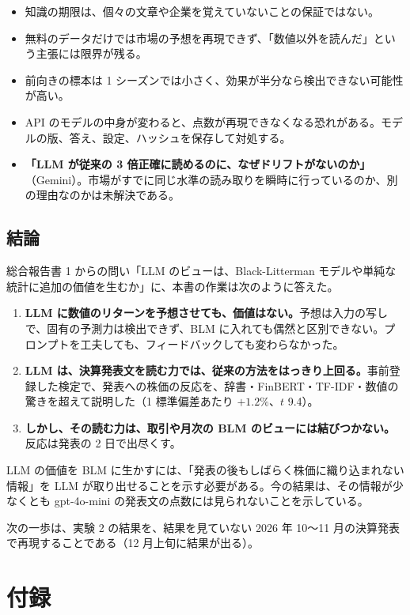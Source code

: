 \documentclass[xelatex,ja=standard,jafont=haranoaji,a4paper,10pt]{bxjsreport}
\begin{document}
\begin{itemize}
\item 知識の期限は、個々の文章や企業を覚えていないことの保証ではない。
\item 無料のデータだけでは市場の予想を再現できず、「数値以外を読んだ」という主張には限界が残る。
\item 前向きの標本は 1 シーズンでは小さく、効果が半分なら検出できない可能性が高い。
\item API のモデルの中身が変わると、点数が再現できなくなる恐れがある。モデルの版、答え、設定、ハッシュを保存して対処する。
\item \textbf{「LLM が従来の 3 倍正確に読めるのに、なぜドリフトがないのか」}（Gemini）。市場がすでに同じ水準の読み取りを瞬時に行っているのか、別の理由なのかは未解決である。
\end{itemize}


\chapter{結論}\label{ch:conclusion}

総合報告書 1 からの問い「LLM のビューは、Black-Litterman モデルや単純な統計に追加の価値を生むか」に、本書の作業は次のように答えた。

\begin{enumerate}
\item \textbf{LLM に数値のリターンを予想させても、価値はない。}予想は入力の写しで、固有の予測力は検出できず、BLM に入れても偶然と区別できない。プロンプトを工夫しても、フィードバックしても変わらなかった。
\item \textbf{LLM は、決算発表文を読む力では、従来の方法をはっきり上回る。}事前登録した検定で、発表への株価の反応を、辞書・FinBERT・TF-IDF・数値の驚きを超えて説明した（1 標準偏差あたり $+1.2\%$、$t$ 9.4）。
\item \textbf{しかし、その読む力は、取引や月次の BLM のビューには結びつかない。}反応は発表の 2 日で出尽くす。
\end{enumerate}

LLM の価値を BLM に生かすには、「発表の後もしばらく株価に織り込まれない情報」を LLM が取り出せることを示す必要がある。今の結果は、その情報が少なくとも gpt-4o-mini の発表文の点数には見られないことを示している。

次の一歩は、実験 2 の結果を、結果を見ていない 2026 年 10〜11 月の決算発表で再現することである（12 月上旬に結果が出る）。

\part{付録}
\end{document}
